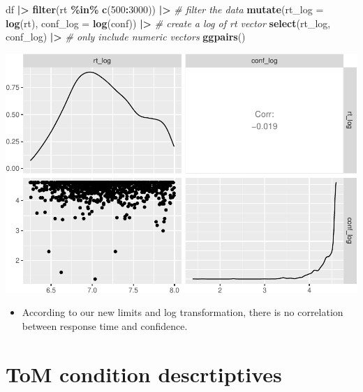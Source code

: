 \documentclass[
]{article}
\newenvironment{Shaded}{\begin{snugshade}}{\end{snugshade}}
\newcommand{\AttributeTok}[1]{\textcolor[rgb]{0.13,0.29,0.53}{#1}}
\newcommand{\CommentTok}[1]{\textcolor[rgb]{0.56,0.35,0.01}{\textit{#1}}}
\newcommand{\DecValTok}[1]{\textcolor[rgb]{0.00,0.00,0.81}{#1}}
\newcommand{\FunctionTok}[1]{\textcolor[rgb]{0.13,0.29,0.53}{\textbf{#1}}}
\newcommand{\NormalTok}[1]{#1}
\newcommand{\SpecialCharTok}[1]{\textcolor[rgb]{0.81,0.36,0.00}{\textbf{#1}}}
\providecommand{\tightlist}{%
  \setlength{\itemsep}{0pt}\setlength{\parskip}{0pt}}
\begin{document}
\begin{Shaded}
\begin{Highlighting}[]
\NormalTok{df }\SpecialCharTok{|\textgreater{}}
  \FunctionTok{filter}\NormalTok{(rt }\SpecialCharTok{\%in\%} \FunctionTok{c}\NormalTok{(}\DecValTok{500}\SpecialCharTok{:}\DecValTok{3000}\NormalTok{)) }\SpecialCharTok{|\textgreater{}} \CommentTok{\# filter the data}
  \FunctionTok{mutate}\NormalTok{(}\AttributeTok{rt\_log =} \FunctionTok{log}\NormalTok{(rt),}
         \AttributeTok{conf\_log =} \FunctionTok{log}\NormalTok{(conf)) }\SpecialCharTok{|\textgreater{}} \CommentTok{\# create a log of rt vector }
  \FunctionTok{select}\NormalTok{(rt\_log,}
\NormalTok{         conf\_log) }\SpecialCharTok{|\textgreater{}} \CommentTok{\# only include numeric vectors}
  \FunctionTok{ggpairs}\NormalTok{()}
\end{Highlighting}
\end{Shaded}

\includegraphics{T5_Data_wrangling_pdf_files/figure-latex/unnamed-chunk-14-1.pdf}

\begin{itemize}
\tightlist
\item
  According to our new limits and log transformation, there is no
  correlation between response time and confidence.
\end{itemize}

\hypertarget{tom-condition-descrtiptives}{%
\section{ToM condition
descrtiptives}\label{tom-condition-descrtiptives}}
\end{document}
